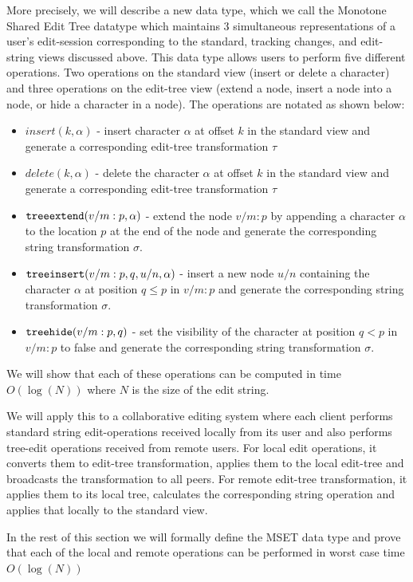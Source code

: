 \documentclass{amsart}
\begin{document}
More precisely, we will describe a new data type, which we call the Monotone Shared Edit Tree datatype which maintains 3 simultaneous representations of a user's edit-session corresponding to the standard, tracking changes, and edit-string views discussed above. This data type allows users to perform five different operations.
Two operations on the standard view (insert or delete a character) and three operations
on the edit-tree view (extend a node, insert a node into a node, or hide a character in a node). The operations are notated as shown below:
\begin{itemize}
\item $insert(k,\alpha)$ - insert character $\alpha$ at offset $k$ in the standard view and generate a corresponding edit-tree transformation $\tau$
\item $delete(k,\alpha)$ - delete the character $\alpha$ at offset $k$ in the standard view and generate a corresponding edit-tree transformation $\tau$
\item ${\tt treeextend}(v/m:p,\alpha)$ - extend the node $v/m:p$ by appending
a character $\alpha$ to the location $p$ at the end of the node and generate
the corresponding string transformation $\sigma$.
\item ${\tt treeinsert}(v/m:p,q,u/n,\alpha) $ -
 insert a new node $u/n$ containing the character $\alpha$
at position $q\le p$ in $v/m:p$ and generate
the corresponding string transformation $\sigma$.
\item ${\tt treehide}(v/m:p,q)$ - set
 the visibility of the character at position $q < p$
in  $v/m:p$ to false and generate
the corresponding string transformation $\sigma$. 
\end{itemize}
We will show that each of these operations can be computed in time $O(\log(N))$ where $N$ is the size of the edit string.

We will apply this to a collaborative editing system where each client
performs standard string edit-operations received locally from its user
and also performs tree-edit operations received from remote users.
For local edit operations, it converts them to edit-tree transformation, applies them 
to the local edit-tree and broadcasts the transformation to all peers. For remote edit-tree transformation, it applies them to its local tree, calculates the corresponding string operation and applies that locally to the standard view.


In the rest of this section we will formally define the MSET data type and prove that each of the local and remote operations can be performed in worst case time $O(\log(N))$
\end{document}
